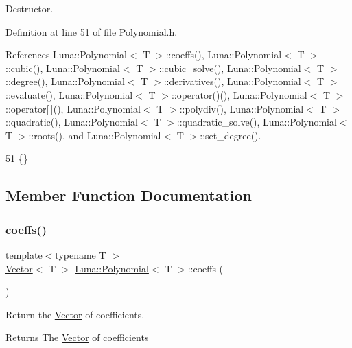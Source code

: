Destructor. 



Definition at line 51 of file Polynomial.\+h.



References Luna\+::\+Polynomial$<$ T $>$\+::coeffs(), Luna\+::\+Polynomial$<$ T $>$\+::cubic(), Luna\+::\+Polynomial$<$ T $>$\+::cubic\+\_\+solve(), Luna\+::\+Polynomial$<$ T $>$\+::degree(), Luna\+::\+Polynomial$<$ T $>$\+::derivatives(), Luna\+::\+Polynomial$<$ T $>$\+::evaluate(), Luna\+::\+Polynomial$<$ T $>$\+::operator()(), Luna\+::\+Polynomial$<$ T $>$\+::operator\mbox{[}$\,$\mbox{]}(), Luna\+::\+Polynomial$<$ T $>$\+::polydiv(), Luna\+::\+Polynomial$<$ T $>$\+::quadratic(), Luna\+::\+Polynomial$<$ T $>$\+::quadratic\+\_\+solve(), Luna\+::\+Polynomial$<$ T $>$\+::roots(), and Luna\+::\+Polynomial$<$ T $>$\+::set\+\_\+degree().


\begin{DoxyCode}
51 \{\}
\end{DoxyCode}


\subsection{Member Function Documentation}
\mbox{\label{classLuna_1_1Polynomial_ab5e966c308b7e66d9c1c20666926db34}} 
\subsubsection{\texorpdfstring{coeffs()}{coeffs()}}
{\footnotesize\ttfamily template$<$typename T $>$ \\
\hyperlink{classLuna_1_1Vector}{Vector}$<$ T $>$ \hyperlink{classLuna_1_1Polynomial}{Luna\+::\+Polynomial}$<$ T $>$\+::coeffs (\begin{DoxyParamCaption}{ }\end{DoxyParamCaption})\hspace{0.3cm}{\ttfamily [inline]}}



Return the \hyperlink{classLuna_1_1Vector}{Vector} of coefficients. 

\begin{DoxyReturn}{Returns}
The \hyperlink{classLuna_1_1Vector}{Vector} of coefficients 
\end{DoxyReturn}


